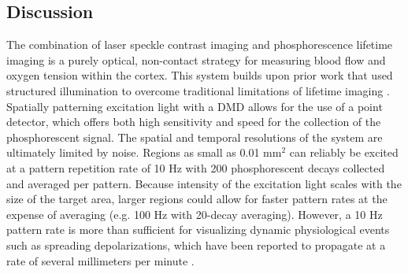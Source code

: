 \documentclass[12pt]{spieman}  %
\begin{document}
\begin{spacing}{2}
\section{Discussion}
\label{sect:discussion}

The combination of laser speckle contrast imaging and phosphorescence lifetime imaging is a purely optical, non-contact strategy for measuring blood flow and oxygen tension within the cortex. This system builds upon prior work that used structured illumination to overcome traditional limitations of lifetime imaging \cite{Ponticorvo:2010uv}. Spatially patterning excitation light with a DMD allows for the use of a point detector, which offers both high sensitivity and speed for the collection of the phosphorescent signal. The spatial and temporal resolutions of the system are ultimately limited by noise. Regions as small as 0.01 mm$^{2}$ can reliably be excited at a pattern repetition rate of 10 Hz with 200 phosphorescent decays collected and averaged per pattern. Because intensity of the excitation light scales with the size of the target area, larger regions could allow for faster pattern rates at the expense of averaging (e.g. 100 Hz with 20-decay averaging). However, a 10 Hz pattern rate is more than sufficient for visualizing dynamic physiological events such as spreading depolarizations, which have been reported to propagate at a rate of several millimeters per minute \cite{Lauritzen:1994vs}.


\end{spacing}
\end{document}
